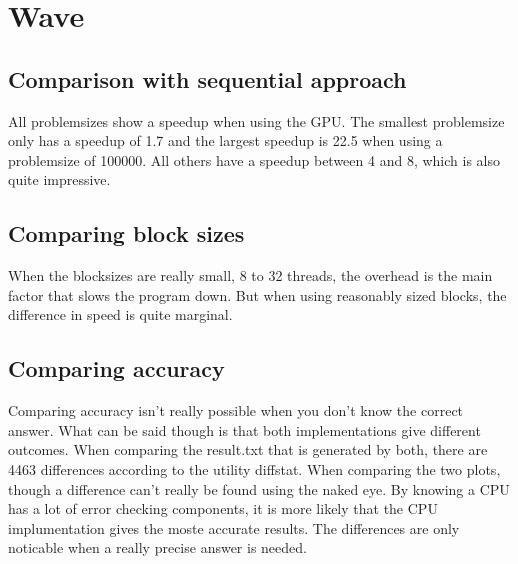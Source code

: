 \documentclass[12pt]{article}
\begin{document}
\maketitle
\section{Wave}
\subsection{Comparison with sequential approach}
All problemsizes show a speedup when using the GPU. The smallest problemsize
only has a speedup of 1.7 and the largest speedup is 22.5 when using a
problemsize of 100000. All others have a speedup between 4 and 8, which is also
quite impressive.

\subsection{Comparing block sizes}
When the blocksizes are really small, 8 to 32 threads, the overhead is the main
factor that slows the program down. But when using reasonably sized blocks, the
difference in speed is quite marginal.

\subsection{Comparing accuracy}
Comparing accuracy isn't really possible when you don't know the correct answer.
What can be said though is that both implementations give different outcomes.
When comparing the result.txt that is generated by both, there are 4463
differences according to the utility diffstat. When comparing the two plots,
though a difference can't really be found using the naked eye.
By knowing a CPU has a lot of error checking components, it is more likely that
the CPU implumentation gives the moste accurate results. The differences are
only noticable when a really precise answer is needed.
\end{document}
